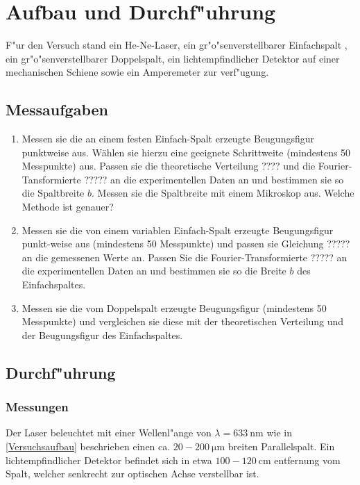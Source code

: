 \section{Aufbau und Durchf"uhrung}
	\label{sec:durchf"uhrung}
	F"ur den Versuch stand ein He-Ne-Laser, ein gr"o"senverstellbarer Einfachspalt , ein gr"o"senverstellbarer Doppelspalt, ein lichtempfindlicher Detektor auf einer mechanischen Schiene sowie ein Amperemeter zur verf"ugung.

	\subsection{Messaufgaben}
		\begin{enumerate}
			\item \label{aufg_1} Messen sie die an einem festen Einfach-Spalt erzeugte Beugungsfigur punktweise aus. Wählen sie hierzu eine geeignete Schrittweite (mindestens 50 Messpunkte) aus. Passen sie die theoretische Verteilung ???? und die Fourier-Tansformierte ????? an die experimentellen Daten an und bestimmen sie so die Spaltbreite $b$. Messen sie die Spaltbreite mit einem Mikroskop aus. Welche Methode ist genauer?

			\item \label{aufg_2} Messen sie die von einem variablen Einfach-Spalt erzeugte Beugungsfigur punkt-weise aus (mindestens 50 Messpunkte) und passen sie Gleichung ????? an die gemessenen Werte an. Passen Sie die Fourier-Transformierte ????? an die experimentellen Daten an und bestimmen sie so die Breite $b$ des Einfachspaltes.

			\item \label{aufg_3} Messen sie die vom Doppelspalt erzeugte Beugungsfigur (mindestens 50 Messpunkte) und vergleichen sie diese mit der theoretischen Verteilung und der Beugungsfigur des Einfachspaltes.
		\end{enumerate}

	\subsection{Durchf"uhrung}

		\subsubsection{Messungen}

			Der Laser beleuchtet mit einer Wellenl"ange von $\lambda = \SI{633}{\nano \meter}$ wie in \ref{Versuchsaufbau} beschrieben einen ca. $20 - 200 \SI{}{\micro \meter}$ breiten Parallelspalt. Ein lichtempfindlicher Detektor befindet sich in etwa $100 - 120 \SI{}{\centi \meter}$ entfernung vom Spalt, welcher senkrecht zur optischen Achse verstellbar ist.

